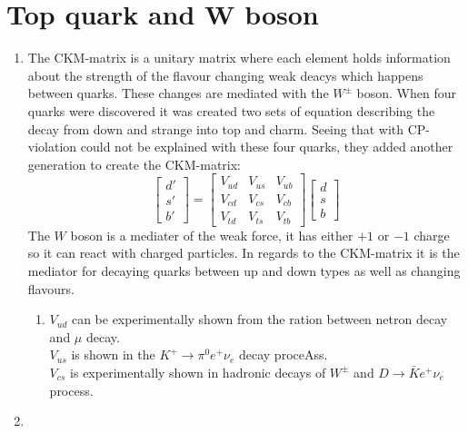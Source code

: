 \section{Top quark and W boson}

\begin{enumerate}
  \item
	The CKM-matrix is a unitary matrix where each element holds information about the
      	strength of the flavour changing weak deacys which happens between quarks.
      	These changes are mediated with the $W^{\pm}$ boson.
      	When four quarks were discovered it was created two sets of equation describing
      	the decay from down and strange into top and charm.
      	Seeing that with CP-violation could not be explained with these four quarks,
      	they added another generation to create the CKM-matrix:
      	\begin{equation}
      	\begin{bmatrix}
      	  d'\\
      	  s'\\
      	  b'
      	\end{bmatrix}
      	=
      	\begin{bmatrix}
      	  V_{ud} & V_{us} & V_{ub} \\
      	  V_{cd} & V_{cs} & V_{cb} \\
      	  V_{td} & V_{ts} & V_{tb} 
      	\end{bmatrix}
      	\begin{bmatrix}
      	  d\\
      	  s\\
      	  b
      	\end{bmatrix}
      	\end{equation}
      	The $W$ boson is a mediater of the weak force, it has either $+1$ or $-1$ charge so it
	can react with charged particles. In regards to the CKM-matrix it is the mediator for
	decaying quarks between up and down types as well as changing flavours.
    \begin{enumerate}
      \item
	$V_{ud}$ can be experimentally shown from the ration between netron decay and
	$\mu$ decay.\\
	$V_{us}$ is shown in the $K^+ \rightarrow \pi^0 e^+ \nu_e$ decay proceAss.\\
	$V_{cs}$ is experimentally shown in hadronic decays of $W^{\pm}$ and 
	$D\rightarrow \bar{K}e^+\nu_e$ process.
    \end{enumerate}
  \item

\end{enumerate}
